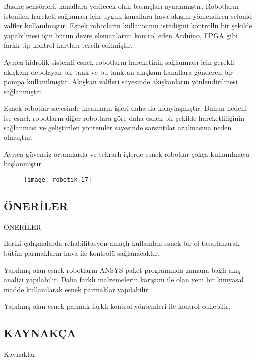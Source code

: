 \documentclass{beamer}
\begin{document}
\begin{frame}
\begin{block}
\item Basınç sensörleri, kanallara verilecek olan basınçları ayarlamıştır. Robotların istenilen hareketi sağlaması için uygun kanallara hava akışını yönlendiren selonid valfler kullanılmıştır. Esnek robotların kullanıcının istediğini kontrollü bir şekilde yapabilmesi için bütün devre elemanlarını kontrol eden Arduino, FPGA gibi farklı tip kontrol kartları tercih edilmiştir.

\item Ayrıca hidrolik sistemli esnek robotların hareketinin sağlanması için gerekli akışkanı depolayan bir tank ve bu tanktan akışkanı kanallara gönderen bir pompa kullanılmıştır. Akışkan valfleri sayesinde akışkanların yönlendirilmesi sağlanmıştır.
\end{block}
\end{frame}

\begin{frame}
\begin{block}
\item Esnek robotlar sayesinde insanların işleri daha da kolaylaşmıştır. Bunun nedeni ise esnek robotların diğer robotlara göre daha esnek bir şekilde hareketliliğinin sağlanması ve geliştirilen yöntemler sayesinde sarsıntılar azalmasına neden olmuştur. \cite{Wallin}

\item Ayrıca güvensiz ortamlarda ve tekrarlı işlerde esnek robotlar çokça kullanılmaya başlanmıştır.\cite{Yetkin}
\end{block}
\begin{figure}
\texttt{[image: robotik-17]}
\caption{\label{Şekil-16}}
\end{figure}
\end{frame}

\subsection{ÖNERİLER }

\begin{frame}{ÖNERİLER}
\item İleriki çalışmalarda rehabilitasyon amaçlı kullanılan esnek bir el tasarlanarak bütün parmakların hava ile kontrolü sağlanacaktır.

\item Yapılmış olan esnek robotların ANSYS paket programında zamana bağlı akış analizi yapılabilir. Daha farklı malzemelerin karışımı ile olan yeni bir kimyasal madde kullanılarak esnek parmaklar yapılabilir. 

\item Yapılmış olan esnek parmak farklı kontrol yöntemleri ile kontrol edilebilir.
\end{frame}


\subsection{KAYNAKÇA}
\begin{frame}[allowframebreaks]{Kaynaklar}

\scriptsize

\end{frame}
\end{document}
